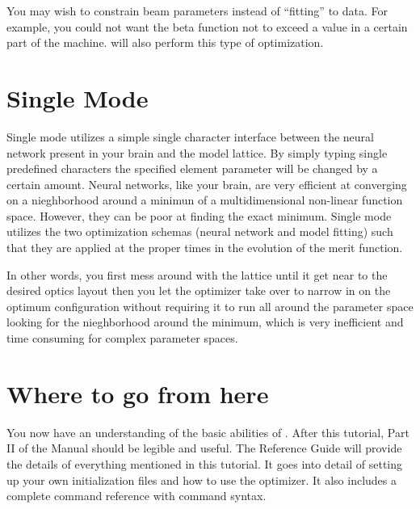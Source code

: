 You may wish to constrain beam
parameters instead of ``fitting'' to data. For example, you could not want
the beta function not to exceed a value in a certain part of the machine. \tao will
also perform this type of optimization.


\section{Single Mode}
\label{s:single_mode}

Single mode utilizes a simple single character interface between the neural 
network present in your brain and the \tao model lattice. By simply typing
single predefined characters the specified element parameter will be changed by
a certain amount. Neural networks, like your brain, are very efficient at
converging on a nieghborhood around a minimun of a multidimensional non-linear
function space. However, they can be poor at finding the exact minimum. Single mode
utilizes the two optimization schemas (neural network and model fitting) such
that they are applied at the proper times in the evolution of the merit
function.

In other words, you first mess around with the lattice until it get near to the
desired optics layout then you let the optimizer take over to narrow in on the
optimum configuration without requiring it to run all around the
parameter space looking for the nieghborhood around the minimum, which is very
inefficient and time consuming for complex parameter spaces.


\section{Where to go from here}
\label{s:where_to_go}

You now have an understanding of the basic abilities of \tao. After this
tutorial, Part II of the \tao Manual should be legible and useful.
The Reference Guide will provide the details of everything mentioned in this tutorial. 
It goes into detail of setting up your own initialization
files and how to use the optimizer. It also includes a complete command
reference with command syntax.


